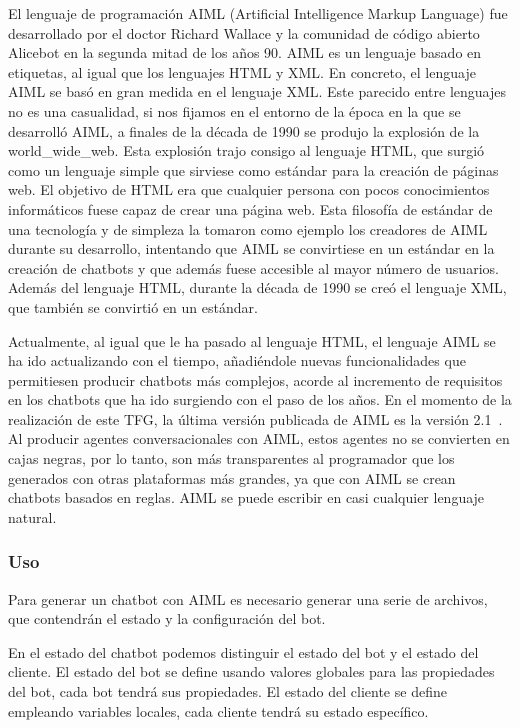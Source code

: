 El lenguaje de programación AIML (Artificial Intelligence Markup Language) fue desarrollado por el doctor Richard Wallace y la comunidad de código abierto Alicebot en la segunda mitad de los años 90. AIML es un lenguaje basado en etiquetas, al igual que los lenguajes HTML y XML. En concreto, el lenguaje AIML se basó en gran medida en el lenguaje XML. Este parecido entre lenguajes no es una casualidad, si nos fijamos en el entorno de la época en la que se desarrolló AIML, a finales de la década de 1990 se produjo la explosión de la \gls{world_wide_web}. Esta explosión trajo consigo al lenguaje HTML, que surgió como un lenguaje simple que sirviese como estándar para la creación de páginas web. El objetivo de HTML era que cualquier persona con pocos conocimientos informáticos fuese capaz de crear una página web. Esta filosofía de estándar de una tecnología y de simpleza la tomaron como ejemplo los creadores de AIML durante su desarrollo, intentando que AIML se convirtiese en un estándar en la creación de chatbots y que además fuese accesible al mayor número de usuarios. Además del lenguaje HTML, durante la década de 1990 se creó el lenguaje XML, que también se convirtió en un estándar.

Actualmente, al igual que le ha pasado al lenguaje HTML, el lenguaje AIML se ha ido actualizando con el tiempo, añadiéndole nuevas funcionalidades que permitiesen producir chatbots más complejos, acorde al incremento de requisitos en los chatbots que ha ido surgiendo con el paso de los años. En el momento de la realización de este TFG, la última versión publicada de AIML es la versión 2.1\ . Al producir agentes conversacionales con AIML, estos agentes no se convierten en cajas negras, por lo tanto, son más transparentes al programador que los generados con otras plataformas más grandes, ya que con AIML se crean chatbots basados en reglas. AIML se puede escribir en casi cualquier lenguaje natural.

\subsubsection*{Uso}

Para generar un chatbot con AIML es necesario generar una serie de archivos, que contendrán el estado y la configuración del bot.

En el estado del chatbot podemos distinguir el estado del bot y el estado del cliente. El estado del bot se define usando valores globales para las propiedades del bot, cada bot tendrá sus propiedades. El estado del cliente se define empleando variables locales, cada cliente tendrá su estado específico.

